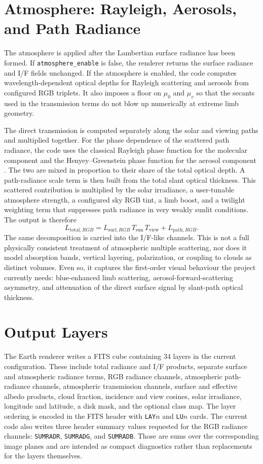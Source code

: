\documentclass[12pt,a4paper]{article}
\begin{document}
\section{Atmosphere: Rayleigh, Aerosols, and Path Radiance}
The atmosphere is applied after the Lambertian surface radiance has been formed. If \texttt{atmosphere\_enable} is false, the renderer returns the surface radiance and I/F fields unchanged. If the atmosphere is enabled, the code computes wavelength-dependent optical depths for Rayleigh scattering and aerosols from configured RGB triplets. It also imposes a floor on \(\mu_0\) and \(\mu_v\) so that the secants used in the transmission terms do not blow up numerically at extreme limb geometry.

The direct transmission is computed separately along the solar and viewing paths and multiplied together. For the phase dependence of the scattered path radiance, the code uses the classical Rayleigh phase function for the molecular component and the Henyey--Greenstein phase function for the aerosol component \parencite{henyey1941,bucholtz1995}. The two are mixed in proportion to their share of the total optical depth. A path-radiance scale term is then built from the total slant optical thickness. This scattered contribution is multiplied by the solar irradiance, a user-tunable atmosphere strength, a configured sky RGB tint, a limb boost, and a twilight weighting term that suppresses path radiance in very weakly sunlit conditions. The output is therefore
\[
L_{\mathrm{total},RGB} = L_{\mathrm{surf},RGB}\,T_{\mathrm{sun}}\,T_{\mathrm{view}} + L_{\mathrm{path},RGB}.
\]
The same decomposition is carried into the I/F-like channels. This is not a full physically consistent treatment of atmospheric multiple scattering, nor does it model absorption bands, vertical layering, polarization, or coupling to clouds as distinct volumes. Even so, it captures the first-order visual behaviour the project currently needs: blue-enhanced limb scattering, aerosol-forward-scattering asymmetry, and attenuation of the direct surface signal by slant-path optical thickness.

\section{Output Layers}
The Earth renderer writes a FITS cube containing 34 layers in the current configuration. These include total radiance and I/F products, separate surface and atmospheric radiance terms, RGB radiance channels, atmospheric path-radiance channels, atmospheric transmission channels, surface and effective albedo products, cloud fraction, incidence and view cosines, solar irradiance, longitude and latitude, a disk mask, and the optional class map. The layer ordering is encoded in the FITS header with \texttt{LAY\(n\)} and \texttt{LU\(n\)} cards. The current code also writes three header summary values requested for the RGB radiance channels: \texttt{SUMRADR}, \texttt{SUMRADG}, and \texttt{SUMRADB}. Those are sums over the corresponding image planes and are intended as compact diagnostics rather than replacements for the layers themselves.
\end{document}
